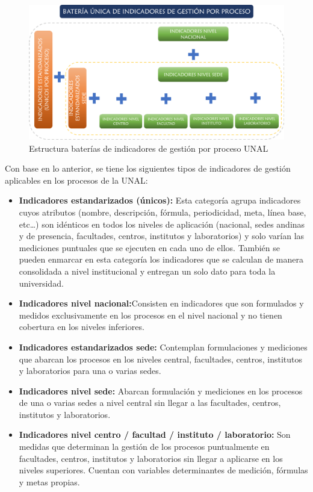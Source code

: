 \documentclass[
]{book}
\begin{document}
\begin{figure}

{\centering \includegraphics[width=0.8\linewidth]{Imagenes/figura_21} 

}

\caption{Estructura baterías de indicadores de gestión por proceso UNAL}\label{fig:figura21}
\end{figure}

Con base en lo anterior, se tiene los siguientes tipos de indicadores de gestión aplicables en los procesos de la UNAL:

\begin{itemize}
\item
  \textbf{Indicadores estandarizados (únicos):} Esta categoría agrupa indicadores cuyos atributos (nombre, descripción, fórmula, periodicidad, meta, línea base, etc\ldots) son idénticos en todos los niveles de aplicación (nacional, sedes andinas y de presencia, facultades, centros, institutos y laboratorios) y solo varían las mediciones puntuales que se ejecuten en cada uno de ellos. También se pueden enmarcar en esta categoría los indicadores que se calculan de manera consolidada a nivel institucional y entregan un solo dato para toda la universidad.
\item
  \textbf{Indicadores nivel nacional:}Consisten en indicadores que son formulados y medidos exclusivamente en los procesos en el nivel nacional y no tienen cobertura en los niveles inferiores.
\item
  \textbf{Indicadores estandarizados sede:} Contemplan formulaciones y mediciones que abarcan los procesos en los niveles central, facultades, centros, institutos y laboratorios para una o varias sedes.
\item
  \textbf{Indicadores nivel sede:} Abarcan formulación y mediciones en los procesos de una o varias sedes a nivel central sin llegar a las facultades, centros, institutos y laboratorios.
\item
  \textbf{Indicadores nivel centro / facultad / instituto / laboratorio:} Son medidas que determinan la gestión de los procesos puntualmente en facultades, centros, institutos y laboratorios sin llegar a aplicarse en los niveles superiores. Cuentan con variables determinantes de medición, fórmulas y metas propias.
\end{itemize}
\end{document}
